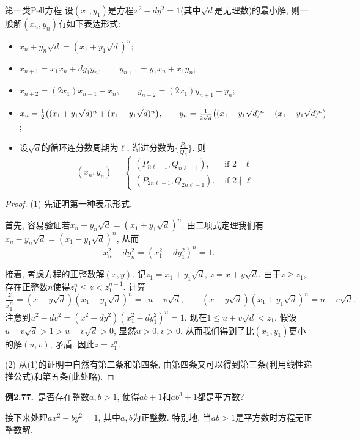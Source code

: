 \begin{theorem}{第一类Pell方程}
	设$(x_1,y_1)$是方程$x^2-dy^2=1$(其中$\sqrt{d}$是无理数)的最小解, 则一般解$(x_n,y_n)$有如下表达形式: 
	
	\begin{itemize}
		\item $x_n+y_n\sqrt{d} = (x_1+y_1\sqrt{d})^n$; 
		\item $x_{n+1}=x_1x_n+dy_1y_n,\qquad y_{n+1}=y_1x_n+x_1y_n$; 
		\item $x_{n+2}=(2x_1) x_{n+1}-x_n,\qquad y_{n+2} = (2x_1)y_{n+1}-y_n$; 
		\item $x_n = \frac{1}{2}\big( (x_1+y_1\sqrt{d})^n + (x_1-y_1\sqrt{d})^n \big),\qquad y_n = \frac{1}{2\sqrt{d}}\big( (x_1+y_1\sqrt{d})^n - (x_1-y_1\sqrt{d})^n \big)$; 
		\item 设$\sqrt{d}$的循环连分数周期为$\ell$, 渐进分数为$\{ \frac{P_n}{Q_n} \}$. 则$$(x_n,y_n) = \begin{cases}
 (P_{n\ell-1},Q_{n\ell -1}), & \text{ if } 2 \mid \ell \\
 (P_{2n\ell-1},Q_{2n\ell -1}).  & \text{ if } 2 \nmid \ell
\end{cases}$$
	\end{itemize}
\end{theorem}
\begin{proof}
	(1) 先证明第一种表示形式. 
	
	首先, 容易验证若$x_n+y_n\sqrt{d} = (x_1+y_1\sqrt{d})^n$, 由二项式定理我们有$x_n-y_n\sqrt{d} = (x_1-y_1\sqrt{d})^n$, 从而$$x_n^2-dy_n^2 = (x_1^2-dy_1^2)^n = 1.$$
	
	接着, 考虑方程的正整数解$(x,y)$. 记$z_1 = x_1+y_1 \sqrt{d}$, $z = x+y\sqrt{d}$. 由于$z \geq z_1$, 存在正整数$n$使得$z_1^n \leq z < z_1^{n+1}$. 计算$$\frac{z}{z_1^n} = (x+y\sqrt{d})(x_1-y_1\sqrt{d})^n =: u+v\sqrt{d},\qquad (x-y\sqrt{d})(x_1+y_1\sqrt{d})^n = u-v\sqrt{d}. $$
	注意到$u^2-dv^2 = (x^2-dy^2)(x_1^2-dy_1^2)^n = 1$. 现在$1 \leq u+v\sqrt{d} < z_1$, 假设$u+v\sqrt{d} > 1 > u-v\sqrt{d} >0$, 显然$u>0,v>0$. 从而我们得到了比$(x_1,y_1)$更小的解$(u,v)$, 矛盾. 因此$z = z_1^n$. 
	
	(2) 从(1)的证明中自然有第二条和第四条, 由第四条又可以得到第三条(利用线性递推公式)和第五条(此处略). 
\end{proof}
\vspace{1em}

\noindent
\textbf{\color{example} 例2.77.}~是否存在整数$a,b>1$, 使得$ab+1$和$ab^3+1$都是平方数? 
\vspace{1em}

接下来处理$ax^2-by^2=1$, 其中$a,b$为正整数. 特别地, 当$ab>1$是平方数时方程无正整数解. 
\vspace{1em}

